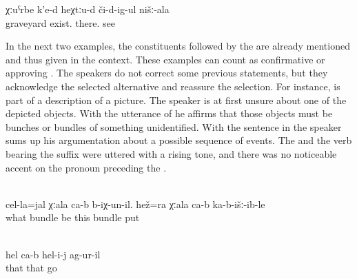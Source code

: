 \begin{exe}
	\ex	\label{ex:‎Up there the graveyard of ours is visible}
	\gll	χːuˁrbe	k'e-d	heχtːu-d	či-d-ig-ul	nišː-ala\\
		graveyard	exist.	there.	see	\\
	\glt	{}
\end{exe}

In the next two examples, the constituents followed by the  are already mentioned and thus given in the context. These examples can count as confirmative or approving . The speakers do not correct some previous statements, but they acknowledge the selected alternative and reassure the selection. For instance,  is part of a description of a picture. The speaker is at first unsure about one of the depicted objects. With the utterance of  he affirms that those objects must be bunches or bundles of something unidentified. With the sentence in  the speaker sums up his argumentation about a possible sequence of events. The  and the verb bearing the  suffix were uttered with a rising tone, and there was no noticeable accent on the pronoun preceding the .
%
\begin{exe}
		\\\label{ex:This is a BUNDLE of something. This BUNDLE also has been put down (there)@27a}%
		\gll	cel-la=jal	χːala	ca-b	b-iχ-un-il. 	hež=ra	χːala	ca-b	ka-b-išː-ib-le\\
			what	bundle		be 	this	bundle		put\\
		\glt	{}

		\\\label{ex:This is it what has happened to him@27b}
		\gll	hel	ca-b	hel-i-j	ag-ur-il\\
			that		that	go\\
		\glt	{}
\end{exe}


